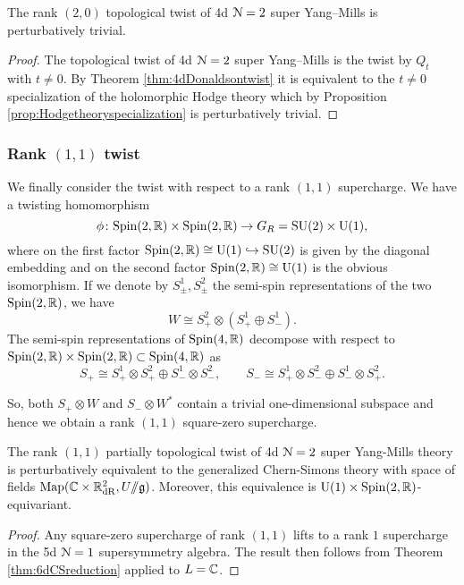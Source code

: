\documentclass[10pt, oneside]{article}
\renewcommand{\U}{\mathrm{U}}
\newcommand{\ham}{/\!\!/}
\begin{document}
\begin{corollary}
The rank $(2,0)$ topological twist of 4d $\mathcal N=2$ super Yang--Mills is perturbatively trivial.
\label{cor:4dDonaldsontwist}
\end{corollary}
\begin{proof}
The topological twist of 4d $\mathcal N=2$ super Yang--Mills is the twist by $Q_t$ with $t\neq 0$. By Theorem \ref{thm:4dDonaldsontwist} it is equivalent to the $t\neq 0$ specialization of the holomorphic Hodge theory which by Proposition \ref{prop:Hodgetheoryspecialization} is perturbatively trivial.
\end{proof}

\subsubsection{Rank \texorpdfstring{$(1,1)$}{(1,1)} twist}
\label{sect:4d_2_11}

We finally consider the twist with respect to a rank $(1,1)$ supercharge. We have a twisting homomorphism
\[
\phi \colon \Spin(2, \RR) \times \Spin(2, \RR) \to G_R=\SU(2)\times \U(1),
\]
where on the first factor $\Spin(2, \RR)\cong \U(1)\hookrightarrow \SU(2)$ is given by the diagonal embedding and on the second factor $\Spin(2, \RR)\cong\U(1)$ is the obvious isomorphism. If we denote by $S_\pm^1, S_\pm^2$ the semi-spin representations of the two $\mathrm{Spin}(2, \mathbb R)$, we have
\[W \cong S_+^2\otimes (S_+^1\oplus S_-^1).\]
The semi-spin representations of $\mathrm{Spin}(4, \mathbb R)$ decompose with respect to $\mathrm{Spin}(2, \mathbb R)\times \mathrm{Spin}(2, \mathbb R)\subset \mathrm{Spin}(4, \mathbb R)$ as
\[S_+\cong S_+^1\otimes S_+^2\oplus S_-^1\otimes S_-^2,\qquad S_-\cong S_+^1\otimes S_-^2\oplus S_-^1\otimes S_+^2.\]

So, both $S_+\otimes W$ and $S_-\otimes W^*$ contain a trivial one-dimensional subspace and hence we obtain a rank $(1, 1)$ square-zero supercharge.

\begin{theorem} \label{thm:4d_11_twist}
The rank $(1,1)$ partially topological twist of 4d $\mathcal{N}=2$ super Yang-Mills theory is perturbatively equivalent to the generalized Chern-Simons theory with space of fields $\mr{Map}(\CC \times \RR^2_{\mr{dR}}, U\ham \gg)$.  
Moreover, this equivalence is $\U(1) \times \Spin(2, \RR)$-equivariant.
\end{theorem}
\begin{proof}
Any square-zero supercharge of rank $(1, 1)$ lifts to a rank $1$ supercharge in the 5d $\mathcal N=1$ supersymmetry algebra.
The result then follows from Theorem \ref{thm:6dCSreduction} applied to $L = \mathbb C$. 
\end{proof}
\end{document}
